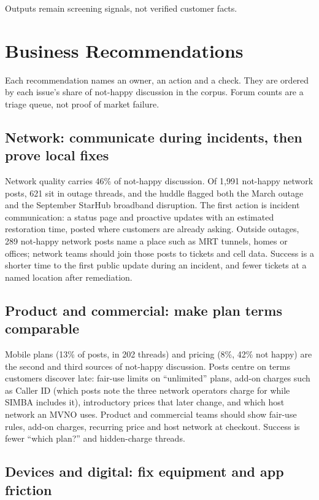 \documentclass[11pt,a4paper]{article}
\begin{document}
Outputs remain screening signals, not verified customer facts.

\section{Business Recommendations}

Each recommendation names an owner, an action and a check. They are ordered by each issue's share of not-happy discussion in the corpus. Forum counts are a triage queue, not proof of market failure.

\subsection{Network: communicate during incidents, then prove local fixes}

Network quality carries 46\% of not-happy discussion. Of 1,991 not-happy network posts, 621 sit in outage threads, and the huddle flagged both the March outage and the September StarHub broadband disruption. The first action is incident communication: a status page and proactive updates with an estimated restoration time, posted where customers are already asking. Outside outages, 289 not-happy network posts name a place such as MRT tunnels, homes or offices; network teams should join those posts to tickets and cell data. Success is a shorter time to the first public update during an incident, and fewer tickets at a named location after remediation.

\subsection{Product and commercial: make plan terms comparable}

Mobile plans (13\% of posts, in 202 threads) and pricing (8\%, 42\% not happy) are the second and third sources of not-happy discussion. Posts centre on terms customers discover late: fair-use limits on ``unlimited'' plans, add-on charges such as Caller ID (which posts note the three network operators charge for while SIMBA includes it), introductory prices that later change, and which host network an MVNO uses. Product and commercial teams should show fair-use rules, add-on charges, recurring price and host network at checkout. Success is fewer ``which plan?'' and hidden-charge threads.

\subsection{Devices and digital: fix equipment and app friction}
\end{document}
